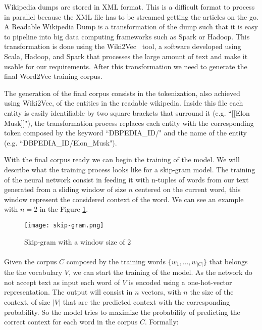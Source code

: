 Wikipedia dumps are stored in XML format. This is a difficult format to process in parallel because the XML file has to be streamed getting the articles on the go. A Readable Wikipedia Dump is a transformation of the dump such that it is easy to pipeline into big data computing frameworks such as Spark or Hadoop. This transformation is done using the Wiki2Vec~\cite{wiki2vec} tool, a software developed using Scala, Hadoop, and Spark that processes the large amount of text and make it usable for our requirements. After this transformation we need to generate the final Word2Vec training corpus. 

The generation of the final corpus consists in the tokenization, also achieved using Wiki2Vec, of the entities in the readable wikipedia. Inside this file each entity is easily identifiable by  two square brackets that surround it (e.g. ``[[Elon Musk]]"), the transformation process replaces each entity with the corresponding token composed by the keyword ``DBPEDIA\_ID/" and the name of the entity (e.g. \mbox{``DBPEDIA\_ID/Elon\_Musk"}).

With the final corpus ready we can begin the training of the model. We will describe what the training process looks like for a skip-gram model. The training of the neural network consist in feeding it with n-tuples of words from our text generated from a sliding window of size \(n\) centered on the current word, this window represent the considered context of the word. We can see an example with \(n = 2\) in the Figure \ref{fig:skip_gram}.

\vspace{-10pt}
\begin{figure}[h]
\texttt{[image: skip-gram.png]}
\caption{Skip-gram with a window size of 2}
\label{fig:skip_gram}
\end{figure}

\pagebreak

\paragraph{}
Given the corpus \(C\) composed by the training words \(\{w_1, \dots, w_{|C|}\}\) that belongs the the vocabulary \(V\), we can start the training of the model. As the network do not accept text as input each word of \(V\) is encoded using a one-hot-vector representation. The output will consist in \(n\) vectors, with \(n\) the size of the context, of size \(|V|\) that are the predicted context with the corresponding probability. So the model tries to maximize the probability of predicting the correct context for each word in the corpus \(C\). Formally: 

